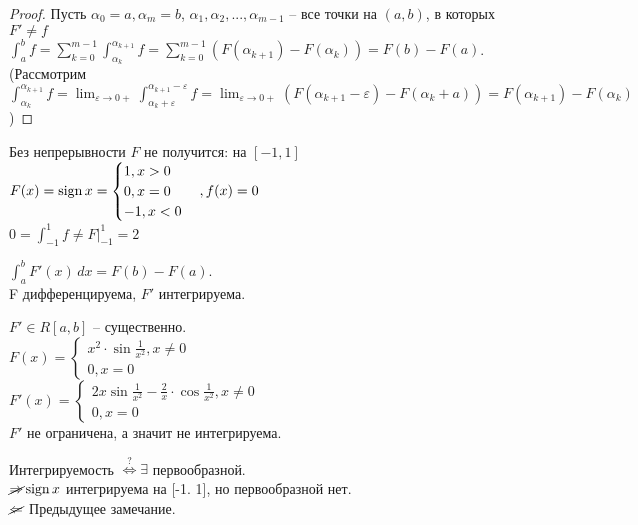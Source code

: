 \begin{proof} 
	Пусть $\alpha_0 = a, \alpha_m = b$, $\alpha_1, \alpha_2, ..., \alpha_{m-1}$ -- все точки на $(a,b)$, в которых $F' \neq f$
	$\displaystyle \int_{a}^{b} f = \sum_{k=0}^{m-1} \int_{\alpha_k}^{\alpha_{k+1}} f = \sum_{k=0}^{m-1} (F(\alpha_{k+1}) - F(\alpha_k)) = F(b) - F(a)$.\\
	(Рассмотрим $\displaystyle \int_{\alpha_k}^{\alpha_{k+1}} f = \lim_{\varepsilon \to	0+} \int_{\alpha_k+\varepsilon}^{\alpha_{k+1}
	 - \varepsilon} f =\lim_{\varepsilon \to 0+} (F(\alpha_{k+1} - \varepsilon) - F(\alpha_k + a)) = F(\alpha_{k+1}) - F(\alpha_k)$)
\end{proof}

\begin{Rem}
	Без непрерывности $F$ не получится: на $[-1,1]$\\
	$ F(x) = \operatorname{sign} x = 
	\begin{cases}
		1, x>0\\
		0, x = 0\\
		-1, x<0	
	\end{cases}, f(x) = 0$\\
	$\displaystyle 0 = \int_{-1}^{1} f \neq F \Big|^1_{-1} = 2$
\end{Rem}

\begin{Rem}
	$\displaystyle \int_{a}^{b} F'(x)\,dx = F(b) - F(a)$.\\ F дифференцируема, $F'$ интегрируема. 
\end{Rem}

\begin{Rem}
	$F' \in R[a, b]$ -- существенно.\\
	$F(x) = \begin{cases}
		x^2 \cdot \sin \frac{1}{x^2}, x \neq 0\\
		0, x = 0
	\end{cases}$\\

	$\displaystyle F'(x) = 
	\begin{cases}
		2x \sin \frac{1}{x^2} - \frac{2}{x} \cdot \cos \frac{1}{x^2}, x \neq 0 \\
		0, x = 0
	\end{cases}$\\ $F'$ не ограничена, а значит не интегрируема.
\end{Rem}

\begin{Rem}
	Интегрируемость $\overset{?}{\Leftrightarrow} \exists$ первообразной.\\
	$\cancel{\Rightarrow} \operatorname{sign} x$ интегрируема на [-1. 1], но первообразной нет.\\
	$\cancel{\Leftarrow}$ Предыдущее замечание.   
\end{Rem}

